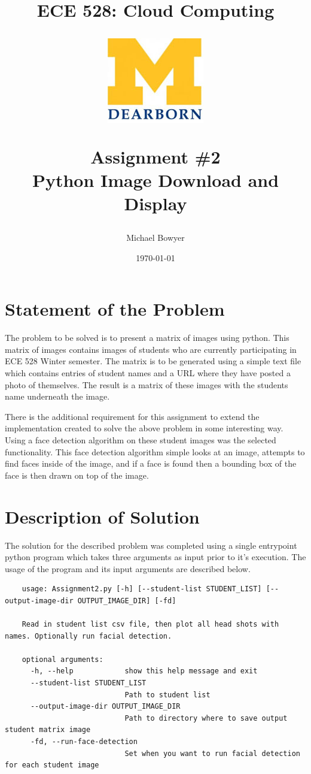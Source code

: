 \documentclass[12pt, letterpaper, final, onecolumn, titlepage] {article}
\title{ECE 528: Cloud Computing \\
	\vspace{1.5cm}
   		\begin{center}\includegraphics{umlogo} \end{center}
	\vspace{1.5cm}
	\textbf{Assignment \#2} \\
Python Image Download and Display}
\author{Michael Bowyer}
\date{\today}
\begin{document}
\maketitle

\doublespacing

\section{Statement of the Problem}

The problem to be solved is to present a matrix of images using python. This matrix of images contains images of students who are currently participating in ECE 528 Winter semester. The matrix is to be generated using a simple text file which contains entries of student names and a URL where they have posted a photo of themselves. The result is a matrix of these images with the students name underneath the image.

There is the additional requirement for this assignment to extend the implementation created to solve the above problem in some interesting way. Using a face detection algorithm on these student images was the selected functionality. This face detection algorithm simple looks at an image, attempts to find faces inside of the image, and if a face is found then a bounding box of the face is then drawn on top of the image.

\pagebreak
\section{Description of Solution}

The solution for the described problem was completed using a single entrypoint python program which takes three arguments as input prior to it's execution. The usage of the program and its input arguments are described below.

\singlespacing
\begin{lstlisting}
	usage: Assignment2.py [-h] [--student-list STUDENT_LIST] [--output-image-dir OUTPUT_IMAGE_DIR] [-fd]

	Read in student list csv file, then plot all head shots with names. Optionally run facial detection.
	
	optional arguments:
	  -h, --help            show this help message and exit
	  --student-list STUDENT_LIST
							Path to student list
	  --output-image-dir OUTPUT_IMAGE_DIR
							Path to directory where to save output student matrix image
	  -fd, --run-face-detection
							Set when you want to run facial detection for each student image
\end{lstlisting}
\doublespacing
\end{document}
